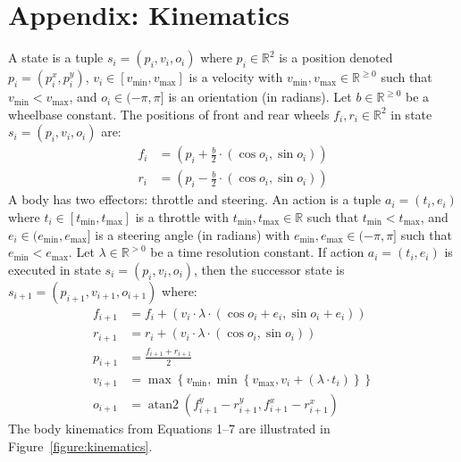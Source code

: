 \documentclass[10pt]{article}
\theoremstyle{plain}
\DeclareMathOperator*{\atantwo}{atan2}
\begin{document}
\newpage



\newpage
\section*{Appendix: Kinematics}
A state is a tuple $s_{i} = (p_{i}, v_{i}, o_{i})$ where
$p_{i} \in \mathbb{R}^{2}$ is a position denoted $p_{i} = (p_{i}^{x}, p_{i}^{y})$,
$v_{i} \in [v_{\min}, v_{\max}]$ is a velocity with $v_{\min}, v_{\max} \in \mathbb{R}^{\ge 0}$ such that $v_{\min} < v_{\max}$,
and $o_{i} \in (-\pi, \pi]$ is an orientation (in radians).
Let $b \in \mathbb{R}^{\ge 0}$ be a wheelbase constant.
The positions of front and rear wheels $f_{i}, r_{i} \in \mathbb{R}^{2}$ in state $s_{i} = (p_{i}, v_{i}, o_{i})$ are:
\begin{align}
    f_{i} & = \left( p_{i} + \frac{b}{2} \cdot (\cos{o_{i}}, \sin{o_{i}}) \right) \\
    r_{i} & = \left( p_{i} - \frac{b}{2} \cdot \left( \cos{o_{i}}, \sin{o_{i}} \right) \right)
\end{align}
A body has two effectors: throttle and steering.
An action is a tuple $a_{i} = (t_{i}, e_{i})$ where
$t_{i} \in [t_{\min}, t_{\max}]$ is a throttle with $t_{\min}, t_{\max} \in \mathbb{R}$ such that $t_{\min} < t_{\max}$,
and $e_{i} \in (e_{\min}, e_{\max}]$ is a steering angle (in radians) with $e_{\min}, e_{\max} \in (-\pi, \pi]$ such that $e_{\min} < e_{\max}$.
Let $\lambda \in \mathbb{R}^{> 0}$ be a time resolution constant.
If action $a_{i} = (t_{i}, e_{i})$ is executed in state $s_{i} = (p_{i}, v_{i}, o_{i})$, then the successor state is $s_{i+1} = (p_{i+1}, v_{i+1}, o_{i+1})$ where:
\begin{align}
    f_{i+1} & = f_{i} + \left( v_{i} \cdot \lambda \cdot \left( \cos{o_{i} + e_{i}}, \sin{o_{i} + e_{i}} \right) \right) \\
    r_{i+1} & = r_{i} + \left( v_{i} \cdot \lambda \cdot \left( \cos{o_{i}}, \sin{o_{i}} \right) \right) \\
    p_{i+1} & = \frac{f_{i+1} + r_{i+1}}{2}  \\
    v_{i+1} & = \max{ \left\{ v_{\min}, \min{ \left\{ v_{\max}, v_{i} + \left( \lambda \cdot t_{i} \right) \right\} } \right\} } \\
    o_{i+1} & = \atantwo{ \left( f_{i+1}^{y} - r_{i+1}^{y}, f_{i+1}^{x} - r_{i+1}^{x} \right) }
\end{align}
The body kinematics from Equations 1--7 are illustrated in Figure~\ref{figure:kinematics}.
\end{document}
